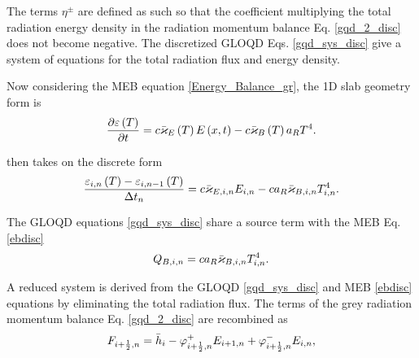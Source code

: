 	The terms $\eta^{\pm}$ are defined as such so that the coefficient multiplying the total radiation energy density in the radiation momentum balance Eq. \eqref{gqd_2_disc} does not become negative. The discretized GLOQD Eqs. \eqref{gqd_sys_disc} give a system of equations for the total radiation flux and energy density. %
	
	\ind Now considering the MEB equation \eqref{Energy_Balance_gr}, the 1D slab geometry form is
	\begin{equation}
		\frac{\partial \varepsilon\left( T\right)}{\partial t} = c\bar{\varkappa}_{E}\left( T\right)E\left( x,t\right) - c\bar{\varkappa}_{B}\left( T\right)a_R T^4. \label{Energy_Balance_gr2}
	\end{equation}
	
	
	
	 then takes on the discrete form
	\begin{equation}
		\frac{\varepsilon_{i,n}\left( T\right) - \varepsilon_{i,n-1}\left( T\right)}{\Delta t_n} = c\bar{\varkappa}_{E,i,n}E_{i,n} - ca_R\bar{\varkappa}_{B,i,n}T_{i,n}^4. \label{ebdisc}
	\end{equation}
	
	The GLOQD equations \eqref{gqd_sys_disc} share a source term with the MEB Eq. \eqref{ebdisc}
	\begin{equation}
		Q_{B,i,n} = ca_R\bar{\varkappa}_{B,i,n}T_{i,n}^4. \label{grsource}
	\end{equation}
	
	A reduced system is derived from the GLOQD \eqref{gqd_sys_disc} and MEB \eqref{ebdisc} equations by eliminating the total radiation flux. The terms of the grey radiation momentum balance Eq. \eqref{gqd_2_disc} are recombined as
	\begin{equation}
		F_{i+\frac{1}{2},n} = \bar{h}_i - \varphi_{i+\frac{1}{2},n}^{+}E_{i+1,n} + \varphi_{i+\frac{1}{2},n}^{-}E_{i,n}, \label{Fisolate}
	\end{equation}
	
